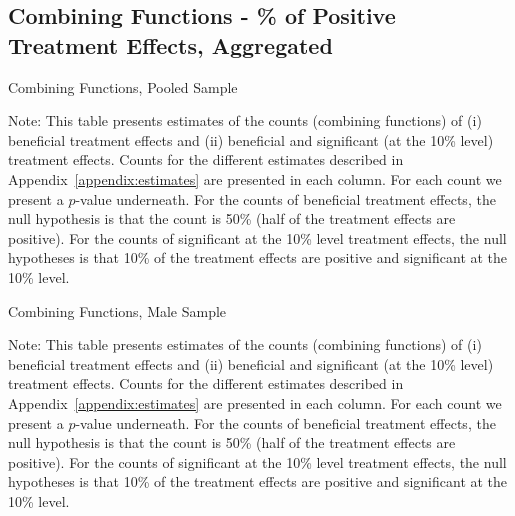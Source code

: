 \def\arraystretch{0.6}

\setlength\tabcolsep{0.3em}

\subsection{{Combining Functions - \% of Positive Treatment Effects, Aggregated}}
	\begin{table}[H]
     \caption{Combining Functions, Pooled Sample} 
     \label{table:abccare_rslt_pooled_counts}
	
	\end{table}  
\begin{spacing}{1}
\begin{footnotesize}
\noindent 	Note: This table presents estimates of the counts (combining functions) of (i) beneficial treatment effects and (ii) beneficial and significant (at the 10\% level) treatment effects. Counts for the different estimates described in Appendix~\ref{appendix:estimates} are presented in each column. For each count we present a $p$-value underneath. For the counts of beneficial treatment effects, the null hypothesis is that the count is 50\% (half of the treatment effects are positive). For the counts of significant at the 10\% level treatment effects, the null hypotheses is that 10\% of the treatment effects are positive and significant at the 10\% level. 
\end{footnotesize}
\end{spacing}

	\begin{table}[H]
     \caption{Combining Functions, Male Sample} 
     \label{table:abccare_rslt_male_counts}
	
	\end{table}
\singlespacing
\begin{spacing}{1}
\begin{footnotesize}
\noindent 	Note: This table presents estimates of the counts (combining functions) of (i) beneficial treatment effects and (ii) beneficial and significant (at the 10\% level) treatment effects. Counts for the different estimates described in Appendix~\ref{appendix:estimates} are presented in each column. For each count we present a $p$-value underneath. For the counts of beneficial treatment effects, the null hypothesis is that the count is 50\% (half of the treatment effects are positive). For the counts of significant at the 10\% level treatment effects, the null hypotheses is that 10\% of the treatment effects are positive and significant at the 10\% level. 
\end{footnotesize}
\end{spacing}

